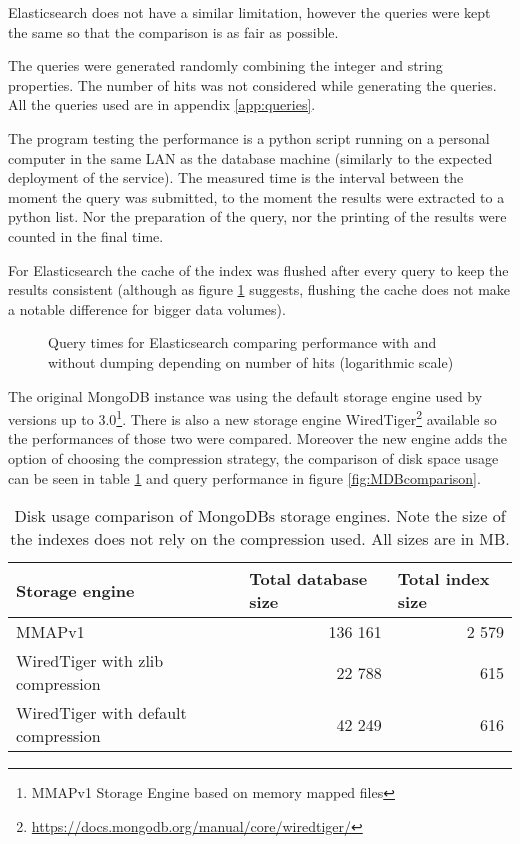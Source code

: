 Elasticsearch does not have a similar limitation, however the queries were kept
the same so that the comparison is as fair as possible. 

The queries were generated randomly combining the integer and string properties. The number of hits was not 
considered while generating the queries. All the queries used are in appendix \ref{app:queries}.

The program testing the performance is a python script running on a personal computer in the same LAN as the 
database machine (similarly to the expected deployment of the service). The measured time is the interval between 
the moment the query was submitted, to the moment the results were extracted to a python list. Nor the 
preparation of the query, nor the printing of the results were counted in the final time. 

For Elasticsearch the cache of the index was flushed after every query to keep the results consistent (although as 
figure \ref{fig:EScache} suggests, flushing the cache does not make a notable difference for bigger data volumes). 

\begin{figure}[h]
	\centering
	
	\caption{Query times for Elasticsearch comparing performance with and without dumping depending on number of 
	hits (logarithmic scale)}
	\label{fig:EScache}
\end{figure}

The original MongoDB instance was using the default storage engine used by versions up to 3.0\footnote{MMAPv1 
Storage Engine based on memory mapped files}. There is also a new storage engine WiredTiger\footnote{
\url{https://docs.mongodb.org/manual/core/wiredtiger/}} available so the performances of those two were compared.
Moreover the new engine adds the option of choosing the compression strategy, the comparison of disk space usage 
can be seen in table \ref{tab:MongoComp} and query performance in figure \ref{fig:MDBcomparison}.

\begin{table}[h]
\centering
\begin{tabular}{|l|r|r|}
\hline
Storage engine                      & \multicolumn{1}{l|}{Total database size} & \multicolumn{1}{l|}{Total index size} \\ \hline
MMAPv1                              & 136 161                                  & 2 579                                 \\ \hline
WiredTiger with zlib compression    & 22 788                                   & 615                                   \\ \hline
WiredTiger with default compression & 42 249                                   & 616                                   \\ \hline
\end{tabular}
\caption{Disk usage comparison of MongoDBs storage engines. Note the size of the indexes does not rely on the
compression used. All sizes are in MB.}
\label{tab:MongoComp}
\end{table}


